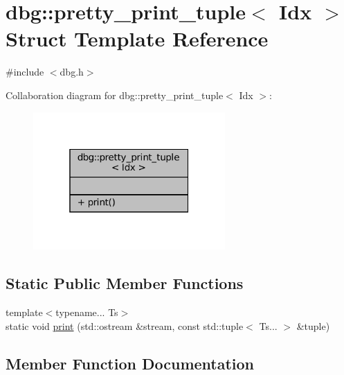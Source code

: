 \hypertarget{structdbg_1_1pretty__print__tuple}{}\section{dbg\+:\+:pretty\+\_\+print\+\_\+tuple$<$ Idx $>$ Struct Template Reference}
\label{structdbg_1_1pretty__print__tuple}


{\ttfamily \#include $<$dbg.\+h$>$}



Collaboration diagram for dbg\+:\+:pretty\+\_\+print\+\_\+tuple$<$ Idx $>$\+:
\nopagebreak
\begin{figure}[H]
\begin{center}
\leavevmode
\includegraphics[width=208pt]{structdbg_1_1pretty__print__tuple__coll__graph}
\end{center}
\end{figure}
\subsection*{Static Public Member Functions}
\begin{DoxyCompactItemize}
\item 
{\footnotesize template$<$typename... Ts$>$ }\\static void \hyperlink{structdbg_1_1pretty__print__tuple_a17c2bca6c330e88da2082efa4c3a9be5}{print} (std\+::ostream \&stream, const std\+::tuple$<$ Ts... $>$ \&tuple)
\end{DoxyCompactItemize}


\subsection{Member Function Documentation}
\mbox{\label{structdbg_1_1pretty__print__tuple_a17c2bca6c330e88da2082efa4c3a9be5}} 
